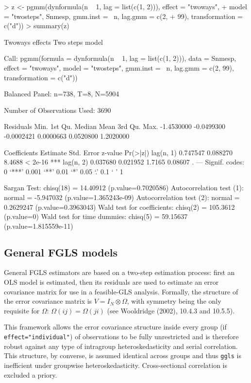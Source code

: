 \documentclass[a4paper]{article}
\begin{document}
\begin{Schunk}
\begin{Sinput}
> z <- pgmm(dynformula(n ~ 1, lag = list(c(1, 2))), effect = "twoways", 
+     model = "twosteps", Snmesp, gmm.inst = ~n, lag.gmm = c(2, 
+         99), transformation = c("d"))
> summary(z)
\end{Sinput}
\begin{Soutput}
Twoways effects Two steps model

Call:
pgmm(formula = dynformula(n ~ 1, lag = list(c(1, 2))), data = Snmesp, 
    effect = "twoways", model = "twosteps", gmm.inst = ~n, lag.gmm = c(2, 
        99), transformation = c("d"))

Balanced Panel: n=738, T=8, N=5904

Number of Observations Used:  3690 

Residuals
      Min.    1st Qu.     Median       Mean    3rd Qu.       Max. 
-1.4530000 -0.0499300 -0.0002421  0.0000663  0.0520800  1.2020000 

Coefficients
          Estimate Std. Error z-value Pr(>|z|)    
lag(n, 1) 0.747547   0.088270  8.4688  < 2e-16 ***
lag(n, 2) 0.037680   0.021952  1.7165  0.08607 .  
---
Signif. codes:  0 ‘***’ 0.001 ‘**’ 0.01 ‘*’ 0.05 ‘.’ 0.1 ‘ ’ 1 

Sargan Test: chisq(18) = 14.40912 (p.value=0.7020586)
Autocorrelation test (1): normal = -5.947032 (p.value=1.365243e-09)
Autocorrelation test (2): normal = 0.2629247 (p.value=0.3963043)
Wald test for coefficients: chisq(2) = 105.3612 (p.value=0)
Wald test for time dummies: chisq(5) = 59.15637 (p.value=1.815559e-11)
\end{Soutput}
\end{Schunk}

\subsection{General FGLS models}
General FGLS estimators are based on a two-step estimation process: first an OLS model is estimated, then its residuals are used to estimate an error covariance matrix for use in a feasible-GLS analysis. Formally, the structure of the error covariance matrix is $ V=I_N \otimes \Omega $, with symmetry being the only requisite for $\Omega$: $ \Omega(ij)=\Omega(ji) $ (see Wooldridge (2002), 10.4.3 and 10.5.5).

This framework allows the error covariance structure inside every group (if \texttt{effect="individual"}) of observations to be fully unrestricted and is therefore robust against any type of intragroup heteroskedasticity and serial correlation. This structure, by converse, is assumed identical across groups and thus \texttt{ggls} is inefficient under groupwise heteroskedasticity. Cross-sectional correlation is excluded a priory.
\end{document}
